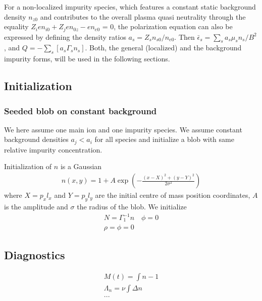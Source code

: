 For a non-localized impurity species, which features a constant static
background density $n_{z0}$ and contributes to the overall plasma quasi
neutrality through the equality $Z_i e n_{i0} + Z_j e n_{0z} - e n_{e0}$ = 0,
the polarization equation can also be expressed by defining the density ratios
$a_s = Z_s n_{s0} / n_{e0}$. Then ${\bar \epsilon_s} = \sum_s a_s \mu_s n_s / B^2$,
and $Q =  - \sum_s [ a_s \Gamma_s n_s ]$.
Both, the general (localized) and the background impurity forms, will be used
in the following sections.

\subsection{Initialization}

\subsubsection{Seeded blob on constant background}
We here assume one main ion and one impurity species.
We assume constant background densities $a_j < a_i$ for all species and initialize a blob
with same relative impurity concentration.

Initialization of $n$ is a Gaussian
\begin{align}
    n(x,y) = 1 + A\exp\left( -\frac{(x-X)^2 + (y-Y)^2}{2\sigma^2}\right)
    \label{}
\end{align}
where $X = p_x l_x$ and $Y=p_yl_y$ are the initial centre of mass position coordinates, $A$ is the amplitude and $\sigma$ the
radius of the blob.
We initialize
\begin{align}
    N = \Gamma_1^{-1} n \quad \phi = 0 \\
    \rho = \phi = 0
    \label{}
\end{align}
\subsection{Diagnostics}
\begin{align}
    M(t) = \int n-1 \\
    \Lambda_n = \nu \int \Delta n  \\
    ...
    \label{}
\end{align}
